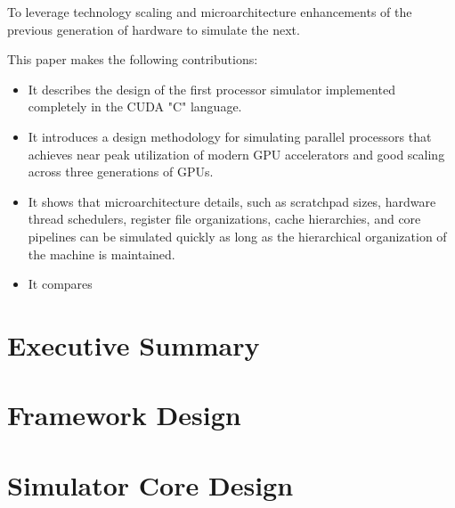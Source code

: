 \documentclass[conference, 10pt]{IEEEtran}
\begin{document}
To leverage technology scaling and microarchitecture enhancements of the
previous generation of hardware to simulate the next.

This paper makes the following contributions:

\begin{itemize}
	\item It describes the design of the first processor simulator implemented
		completely in the CUDA "C" language.

	\item It introduces a design methodology for simulating parallel processors
		that achieves near peak utilization of modern GPU accelerators and
		good scaling across three generations of GPUs.
		
	\item It shows that microarchitecture details, such as scratchpad sizes,
		hardware thread schedulers, register file organizations, cache
		hierarchies, and core pipelines can be simulated quickly as long as
		the hierarchical organization of the machine is maintained.
	
	\item It compares 
\end{itemize}


\section{Executive Summary}

\section{Framework Design}

\section{Simulator Core Design}
\end{document}
